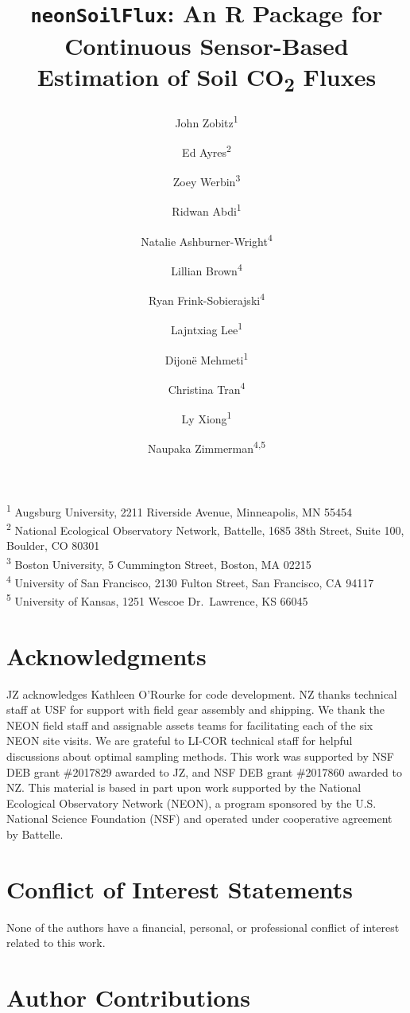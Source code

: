 \documentclass[
  letterpaper,
  DIV=11,
  numbers=noendperiod]{scrartcl}
\title{\texttt{neonSoilFlux}: An R Package for Continuous Sensor-Based
Estimation of Soil CO\textsubscript{2} Fluxes}
\author{John Zobitz\textsuperscript{1} \and Ed
Ayres\textsuperscript{2} \and Zoey Werbin\textsuperscript{3} \and Ridwan
Abdi\textsuperscript{1} \and Natalie
Ashburner-Wright\textsuperscript{4} \and Lillian
Brown\textsuperscript{4} \and Ryan
Frink-Sobierajski\textsuperscript{4} \and Lajntxiag
Lee\textsuperscript{1} \and Dijonë
Mehmeti\textsuperscript{1} \and Christina
Tran\textsuperscript{4} \and Ly Xiong\textsuperscript{1} \and Naupaka
Zimmerman\textsuperscript{4,5}}
\date{}
\begin{document}
\maketitle

\textsuperscript{1} Augsburg University, 2211 Riverside Avenue,
Minneapolis, MN 55454\\
\textsuperscript{2} National Ecological Observatory Network, Battelle,
1685 38th Street, Suite 100, Boulder, CO 80301\\
\textsuperscript{3} Boston University, 5 Cummington Street, Boston, MA
02215\\
\textsuperscript{4} University of San Francisco, 2130 Fulton Street, San
Francisco, CA 94117\\
\textsuperscript{5} University of Kansas, 1251 Wescoe Dr.~Lawrence, KS
66045

\section*{Acknowledgments}\label{acknowledgments}

JZ acknowledges Kathleen O'Rourke for code development. NZ thanks
technical staff at USF for support with field gear assembly and
shipping. We thank the NEON field staff and assignable assets teams for
facilitating each of the six NEON site visits. We are grateful to LI-COR
technical staff for helpful discussions about optimal sampling methods.
This work was supported by NSF DEB grant \#2017829 awarded to JZ, and
NSF DEB grant \#2017860 awarded to NZ. This material is based in part
upon work supported by the National Ecological Observatory Network
(NEON), a program sponsored by the U.S. National Science Foundation
(NSF) and operated under cooperative agreement by Battelle.

\section*{Conflict of Interest
Statements}\label{conflict-of-interest-statements}

None of the authors have a financial, personal, or professional conflict
of interest related to this work.

\section*{Author Contributions}\label{author-contributions}
\end{document}
